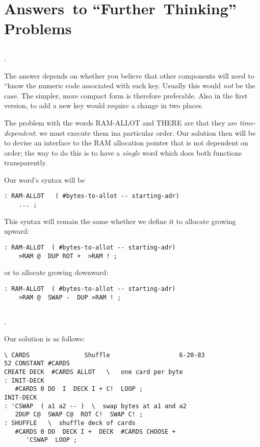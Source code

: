 \chapter{Answers~to 
``Further~Thinking''
Problems}
\section{}
\begin{list}%
{.}{
    \setlength{\rightmargin}{\leftmargin}}
\item The answer depends on whether you believe that other components will
need to ``know the numeric code associated with each key.  Usually this
would \emph{not} be the case.  The simpler, more compact form is therefore
preferable.  Also in the first version, to add a new key would require a 
change in two places.
\item The problem with the words RAM-ALLOT and THERE are that they are 
\emph{time-dependent}:  we must execute them ina particular order.  Our solution
then will be to devise an interface to the RAM allocation pointer that is not
dependent on order; the way to do this is to have a \emph{single} word which does
both functions transparently.

Our word's syntax will be
\begin{verbatim}
: RAM-ALLOT   ( #bytes-to-allot -- starting-adr) 
    ... ;
\end{verbatim}
This syntax will remain the same whether we define it to allocate growing 
upward:
\begin{verbatim}
: RAM-ALLOT  ( #bytes-to-allot -- starting-adr)
    >RAM @  DUP ROT +  >RAM ! ;
\end{verbatim}
or to allocate growing downward:
\begin{verbatim}
: RAM-ALLOT  ( #bytes-to-allot -- starting-adr)
    >RAM @  SWAP -  DUP >RAM ! ;
\end{verbatim}
\end{list}

\section{}
\setcounter{exercise}{3}
\begin{list}%
{.}{
    \setlength{\rightmargin}{\leftmargin}}
\item Our solution is as follows:
\begin{verbatim}
\ CARDS               Shuffle                   6-20-83
52 CONSTANT #CARDS
CREATE DECK  #CARDS ALLOT   \   one card per byte
: INIT-DECK
   #CARDS 0 DO  I  DECK I + C!  LOOP ;
INIT-DECK
: 'CSWAP  ( a1 a2 -- )  \  swap bytes at a1 and a2
   2DUP C@  SWAP C@  ROT C!  SWAP C! ;
: SHUFFLE   \  shuffle deck of cards
   #CARDS 0 DO  DECK I +  DECK  #CARDS CHOOSE +
      'CSWAP  LOOP ;
\end{verbatim}
\end{list}
